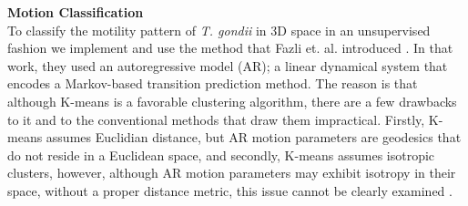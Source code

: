\documentclass[./dissertation.tex]{subfiles}
\begin{document}
\textbf{Motion Classification} \\
To classify the motility pattern of \textit{T. gondii} in 3D space in an unsupervised fashion we implement and use the method that Fazli et. al. introduced \cite{fazli2019lightweight}. In that work, they used an autoregressive model (AR); a linear dynamical system that encodes a Markov-based transition prediction method. The reason is that although K-means is a favorable clustering algorithm, there are a few drawbacks to it and to the conventional methods that draw them impractical. Firstly, K-means assumes Euclidian distance, but AR motion parameters are geodesics that do not reside in a Euclidean space, and secondly, K-means assumes isotropic clusters, however, although AR motion parameters may exhibit isotropy in their space, without a proper distance metric, this issue cannot be clearly examined \cite{fazli2019lightweight}.
\end{document}
